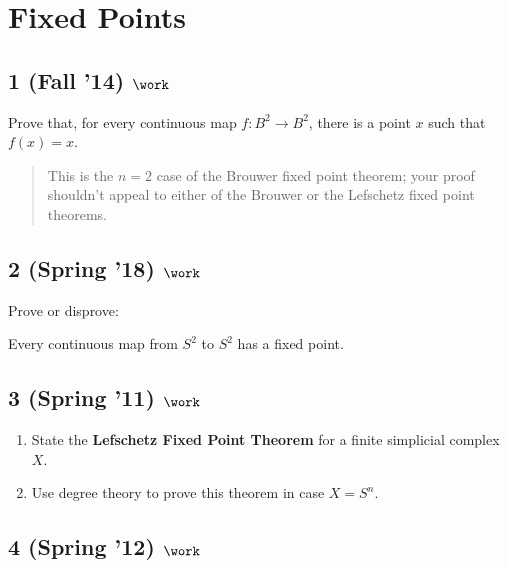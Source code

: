 \hypertarget{fixed-points}{%
\section{Fixed Points}\label{fixed-points}}

\hypertarget{fall-14-work-5}{%
\subsection{\texorpdfstring{1 (Fall '14)
\(\work\)}{1 (Fall '14) \textbackslash work}}\label{fall-14-work-5}}

Prove that, for every continuous map \(f : B^2 \to B^2\), there is a
point \(x\) such that \(f (x) = x\).

\begin{quote}
This is the \(n = 2\) case of the Brouwer fixed point theorem; your
proof shouldn't appeal to either of the Brouwer or the Lefschetz fixed
point theorems.
\end{quote}

\hypertarget{spring-18-work-3}{%
\subsection{\texorpdfstring{2 (Spring '18)
\(\work\)}{2 (Spring '18) \textbackslash work}}\label{spring-18-work-3}}

Prove or disprove:

Every continuous map from \(S^2\) to \(S^2\) has a fixed point.

\hypertarget{spring-11-work-3}{%
\subsection{\texorpdfstring{3 (Spring '11)
\(\work\)}{3 (Spring '11) \textbackslash work}}\label{spring-11-work-3}}

\begin{enumerate}
\def\labelenumi{\alph{enumi}.}
\item
  State the \textbf{Lefschetz Fixed Point Theorem} for a finite
  simplicial complex \(X\).
\item
  Use degree theory to prove this theorem in case \(X = S^n\).
\end{enumerate}

\hypertarget{spring-12-work-3}{%
\subsection{\texorpdfstring{4 (Spring '12)
\(\work\)}{4 (Spring '12) \textbackslash work}}\label{spring-12-work-3}}

